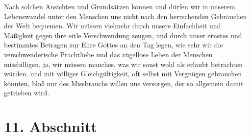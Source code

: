 {Nach solchen Ansichten und Grundsätzen können und dürfen wir in unserem
Lebenswandel unter den Menschen uns nicht nach den herrschenden Gebräuchen der
Welt bequemen. Wir müssen vielmehr durch unsere Einfachheit und Mäßigkeit gegen
ihre eitle Verschwendung zeugen, und durch unser ernstes und
bestimmtes Betragen
zur Ehre Gottes an den Tag legen, wie sehr wir die verschwenderische Prachtliebe
und das zügellose Leben der Menschen missbilligen, ja, wir müssen manches, was
wir sonst wohl als erlaubt betrachten würden, und mit völliger Gleichgültigkeit,
oft selbst mit Vergnügen gebrauchen könnten, bloß nur des Missbrauchs willen uns
versorgen, der so allgemein damit getrieben wird.

\section{11. Abschnitt} \label{kap17_ab11}

}

